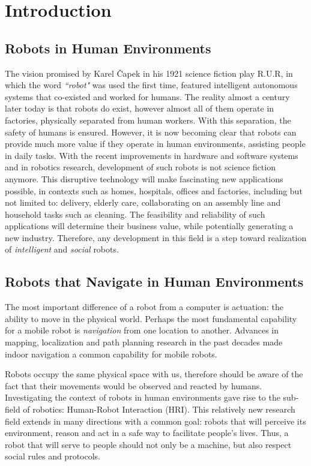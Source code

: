 \chapter{Introduction}
\label{chapter:introduction}

\section{Robots in Human Environments}

The vision promised by Karel \v{C}apek in his 1921 science fiction play R.U.R, in which the word \textit{``robot"} was used the first time, featured intelligent autonomous systems that co-existed and worked for humans. The reality almost a century later today is that robots do exist, however almost all of them operate in factories, physically separated from human workers. With this separation, the safety of humans is ensured. However, it is now becoming clear that robots can provide much more value if they operate in human environments, assisting people in daily tasks. With the recent improvements in hardware and software systems and in robotics research, development of such robots is not science fiction anymore. This disruptive technology will make fascinating new applications possible, in contexts such as homes, hospitals, offices and factories, including but not limited to: delivery, elderly care, collaborating on an assembly line and household tasks such as cleaning. The feasibility and reliability of such applications will determine their business value, while potentially generating a new industry. Therefore, any development in this field is a step toward realization of \textit{intelligent} and \textit{social} robots.

\section{Robots that Navigate in Human Environments}

The most important difference of a robot from a computer is actuation: the ability to move in the physical world. Perhaps the most fundamental capability for a mobile robot is \textit{navigation} from one location to another. Advances in mapping, localization and path planning research in the past decades made indoor navigation a common capability for mobile robots. 

Robots occupy the same physical space with us, therefore should be aware of the fact that their movements would be observed and reacted by humans. Investigating the context of robots in human environments gave rise to the sub-field of robotics: Human-Robot Interaction (HRI). This relatively new research field extends in many directions with a common goal: robots that will perceive its environment, reason and act in a safe way to facilitate people's lives. Thus, a robot that will serve to people should not only be a machine, but also respect social rules and protocols.

